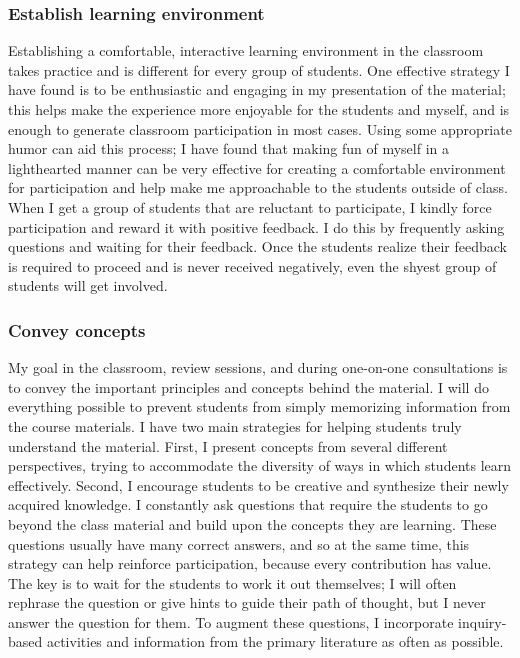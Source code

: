 \documentclass[10pt]{article}
\begin{document}
\subsubsection*{Establish learning environment}
Establishing a comfortable, interactive learning environment in the classroom
takes practice and is different for every group of students.
One effective strategy I have found is to be enthusiastic and engaging in my
presentation of the material; this helps make the experience more enjoyable for
the students and myself, and is enough to generate classroom participation in
most cases.
Using some appropriate humor can aid this process; I have found that making fun
of myself in a lighthearted manner can be very effective for creating a
comfortable environment for participation and help make me approachable to the
students outside of class.
When I get a group of students that are reluctant to participate, I kindly
force participation and reward it with positive feedback.
I do this by frequently asking questions and waiting for their feedback.
Once the students realize their feedback is required to proceed and is never
received negatively, even the shyest group of students will get involved.

\subsubsection*{Convey concepts}
My goal in the classroom, review sessions, and during one-on-one consultations
is to convey the important principles and concepts behind the material.
I will do everything possible to prevent students from simply memorizing
information from the course materials.
I have two main strategies for helping students truly understand the material.
First, I present concepts from several different perspectives, trying to
accommodate the diversity of ways in which students learn effectively.
Second, I encourage students to be creative and synthesize their newly acquired
knowledge.
I constantly ask questions that require the students to go beyond the class
material and build upon the concepts they are learning.
These questions usually have many correct answers, and so at the same time,
this strategy can help reinforce participation, because every contribution has
value.
The key is to wait for the students to work it out themselves; I will often
rephrase the question or give hints to guide their path of thought, but I never
answer the question for them.
To augment these questions, I incorporate inquiry-based activities and
information from the primary literature as often as possible. 
\end{document}
